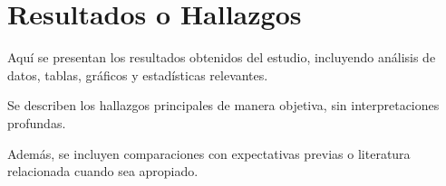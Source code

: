 \section{Resultados o Hallazgos}
\label{sec:resultados}

Aquí se presentan los resultados obtenidos del estudio, incluyendo análisis de datos, tablas, gráficos y estadísticas relevantes.

Se describen los hallazgos principales de manera objetiva, sin interpretaciones profundas.

Además, se incluyen comparaciones con expectativas previas o literatura relacionada cuando sea apropiado.